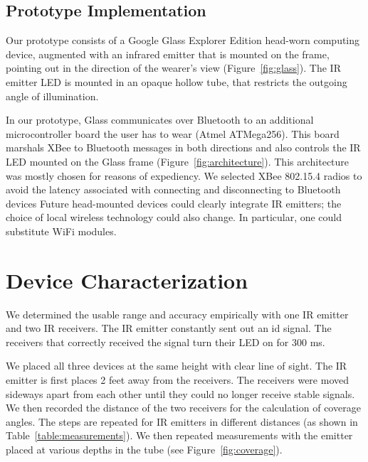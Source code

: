 \subsection{Prototype Implementation}
Our prototype consists of a Google Glass Explorer Edition head-worn computing device, augmented with an infrared emitter that is mounted on the frame, pointing out in the direction of the wearer's view (Figure~\ref{fig:glass}). The IR emitter LED is mounted in an opaque hollow tube, that restricts the outgoing angle of illumination. 

In our prototype, Glass communicates over Bluetooth to an additional microcontroller board the user has to wear (Atmel ATMega256). This board marshals XBee to Bluetooth messages in both directions and also controls the IR LED mounted on the Glass frame (Figure~\ref{fig:architecture}). This architecture was mostly chosen for reasons of expediency. We selected XBee 802.15.4 radios to avoid the latency associated with connecting and disconnecting to Bluetooth devices   Future head-mounted devices could clearly integrate IR emitters; the choice of local wireless technology could also change. In particular, one could substitute WiFi modules. 

\section{Device Characterization}
We determined the usable range and accuracy empirically with one IR emitter and two IR receivers. The IR emitter constantly sent out an id signal. The receivers that correctly received the signal turn their LED on for 300 ms.

We placed all three devices at the same height with clear line of sight. The IR emitter is first places 2 feet away from the receivers. The receivers were moved sideways apart from each other until they could no longer receive stable signals. We then recorded the distance of the two receivers for the calculation of coverage angles. The steps are repeated for IR emitters in different distances (as shown in Table~\ref{table:measurements}). We then repeated measurements with the emitter  placed at various depths in the tube (see Figure~\ref{fig:coverage}). 

